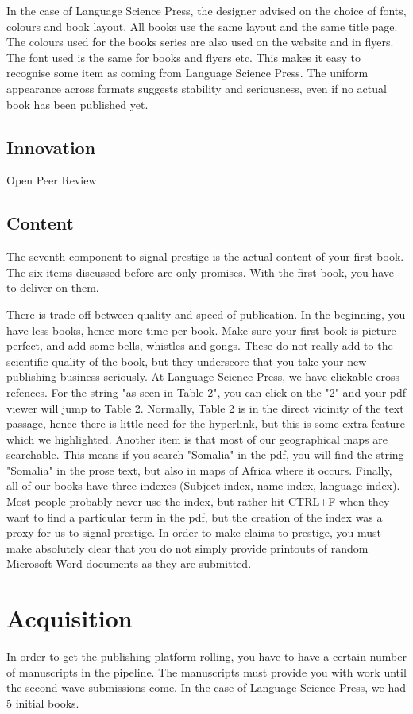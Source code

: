 \documentclass[output=guidelines,guidelines] {langscibook}
\begin{document}
In the case of Language Science Press, the designer advised on the choice of fonts, colours and book layout. All books use the same layout and the same title page. The colours used for the books series are also used on the website and in flyers. The font used is the same for books and flyers etc. This makes it easy to recognise some item as coming from Language Science Press. The uniform appearance across formats suggests stability and seriousness, even if no actual book has been published yet. 

\subsection{Innovation}
Open Peer Review%

\subsection{Content}
The seventh component to signal prestige is the actual content of your first book. The six items discussed before are only promises. With the first book, you have to deliver on them. 

There is trade-off between quality and speed of publication. In the beginning, you have less books, hence more time per book. Make sure your first book is picture perfect, and add some bells, whistles and gongs. These do not really add to the scientific quality of the book, but they underscore that you take your new publishing business seriously. At Language Science Press, we have clickable cross-refences. For the string "as seen in Table 2", you can click on the "2" and your pdf viewer will jump to Table 2. Normally, Table 2 is in the direct vicinity of the text passage, hence there is little need for the hyperlink, but this is some extra feature which we highlighted. Another item is that most of our geographical maps are searchable. This means if you search "Somalia" in the pdf, you will find the string "Somalia" in the prose text, but also in maps of Africa where it occurs. Finally, all of our books have three indexes (Subject index, name index, language index). Most people probably never use the index, but rather hit CTRL+F when they want to find a particular term in the pdf, but the creation of the index was a proxy for us to signal prestige. In order to make claims to prestige, you must make absolutely clear that you do not simply provide printouts of random Microsoft Word documents as they are submitted. 


\section{Acquisition}
In order to get the publishing platform rolling, you have to have a certain number of manuscripts in the pipeline. The manuscripts must provide you with work until the second wave submissions come. In the case of Language Science Press, we had 5%
 initial books. 
\end{document}

